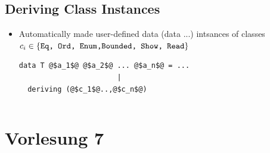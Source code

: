 \documentclass{article}
\newcommand{\Haskell}[1]{\texttt{#1}}
\begin{document}
\subsection{Deriving Class Instances}
\begin{itemize}
\item Automatically made user-defined data (data ...) intsances of classes $c_i \in \{\text{\Haskell{Eq, Ord, Enum,Bounded, Show, Read}}\}$
\begin{verbatim}
data T @$a_1$@ @$a_2$@ ... @$a_n$@ = ...
                       |
  deriving (@$c_1$@..,@$c_n$@)
\end{verbatim}
\end{itemize}
\inputminted{Haskell}{RockPaperScissor-deriving.hs}
\clearpage
\section{Vorlesung 7}
\end{document}
